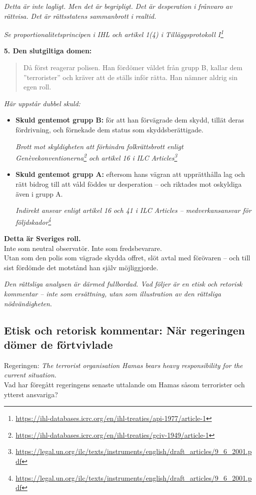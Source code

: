 \documentclass[12pt]{article}
\newcommand{\lagrum}[1]{\par\vspace{3mm}\textit{#1}\par\vspace{5mm}}
\begin{document}
\textit{Detta är inte lagligt. Men det är begripligt. Det är desperation i frånvaro av rättvisa. Det är rättsstatens sammanbrott i realtid.}
\lagrum{Se proportionalitetsprincipen i IHL och artikel 1(4) i Tilläggsprotokoll I\footnote{\url{https://ihl-databases.icrc.org/en/ihl-treaties/api-1977/article-1}}}

\textbf{5. Den slutgiltiga domen:}
\begin{quote}
Då först reagerar polisen. Han fördömer våldet från grupp B, kallar dem ”terrorister” och kräver att de ställs inför rätta. Han nämner aldrig sin egen roll.
\end{quote}

\textit{Här uppstår dubbel skuld:}
\begin{itemize}
    \item \textbf{Skuld gentemot grupp B:} för att han förvägrade dem skydd, tillät deras fördrivning, och förnekade dem status som skyddsberättigade.
    \lagrum{Brott mot skyldigheten att förhindra folkrättsbrott enligt Genèvekonventionerna\footnote{\url{https://ihl-databases.icrc.org/en/ihl-treaties/gciv-1949/article-1}} och artikel 16 i ILC Articles\footnote{\url{https://legal.un.org/ilc/texts/instruments/english/draft_articles/9_6_2001.pdf}}}

    \item \textbf{Skuld gentemot grupp A:} eftersom hans vägran att upprätthålla lag och rätt bidrog till att våld föddes ur desperation – och riktades mot oskyldiga även i grupp A.
    \lagrum{Indirekt ansvar enligt artikel 16 och 41 i ILC Articles – medverkansansvar för följdskador\footnote{\url{https://legal.un.org/ilc/texts/instruments/english/draft_articles/9_6_2001.pdf}}}
\end{itemize}

\textbf{Detta är Sveriges roll.}\\
Inte som neutral observatör. Inte som fredsbevarare.\\
Utan som den polis som vägrade skydda offret, slöt avtal med förövaren – och till sist fördömde det motstånd han själv möjliggjorde.

\vspace{1em}
\noindent\textit{Den rättsliga analysen är därmed fullbordad. Vad följer är en etisk och retorisk kommentar – inte som ersättning, utan som illustration av den rättsliga nödvändigheten.}



\subsection*{Etisk och retorisk kommentar: När regeringen dömer de förtvivlade}
Regeringen: \textit{The terrorist organisation Hamas bears heavy responsibility for the current situation. }\\
Vad har föregått regeringens senaste uttalande om Hamas såsom terrorister och ytterst ansvariga?
\end{document}

